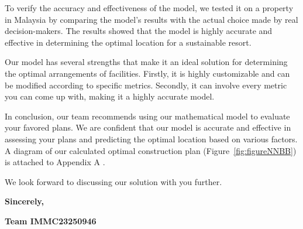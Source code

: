 \documentclass[./main.tex]{subfiles}
\begin{document}
    To verify the accuracy and effectiveness of the model, we tested it on a property in Malaysia by comparing the model's results with the actual choice made by real decision-makers.
    The results showed that the model is highly accurate and effective in determining the optimal location for a sustainable resort.

    Our model has several strengths that make it an ideal solution for determining the optimal arrangements of facilities.
    Firstly, it is highly customizable and can be modified according to specific metrics.
    Secondly, it can involve every metric you can come up with, making it a highly accurate model.

    In conclusion, our team recommends using our mathematical model to evaluate your favored plans.
    We are confident that our model is accurate and effective in assessing your plans and predicting the optimal location based on various factors.
    A diagram of our calculated optimal construction plan (Figure~\ref{fig:figureNNBB}) is attached to Appendix A .

    We look forward to discussing our solution with you further.


    \vspace{1.5ex}

    \textbf{Sincerely,}

    \raggedright
    \textbf{Team IMMC23250946}
\end{document}
